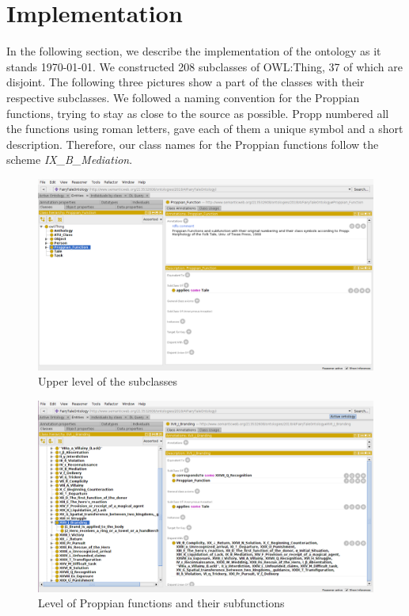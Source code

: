 \documentclass[10pt,a4paper]{article}
\begin{document}
\section{Implementation}
In the following section, we describe the implementation of the ontology as it stands \today. 
We constructed 208 subclasses of OWL:Thing, 37 of which are disjoint. The following three pictures show a part of the classes with their respective subclasses. We followed a naming convention for the Proppian functions, trying to stay as close to the source \cite{propp1968} as possible. Propp numbered all the functions using roman letters, gave each of them a unique symbol and a short description. Therefore, our class names for the Proppian functions follow the scheme \textit{IX\_B\_Mediation}.



\begin{figure} [H]
\centering
 	\includegraphics[scale=0.3]{Screen1.png}
 	\caption{Upper level of the subclasses}
\end{figure}

\begin{figure}[H]
\centering
 	\includegraphics[scale=0.3]{Screen2.png}
 	\caption{Level of Proppian functions and their subfunctions}
\end{figure}
\end{document}
